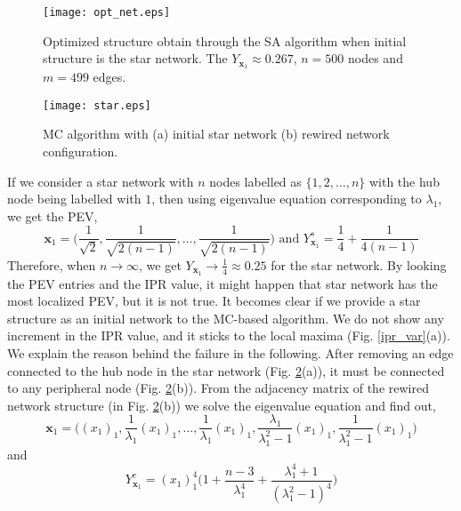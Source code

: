 \documentclass[envcountreset,oribibl]{llncs}
\begin{document}
\begin{figure}[t]
\begin{center}
\texttt{[image: opt\_net.eps]}
\caption{Optimized structure obtain through the SA algorithm when initial structure is the star network. The $Y_{\bm{x}_1} \approx 0.267$, $n=500$ nodes and $m=499$ edges.}
\label{opt_net_from_star}
\end{center}
\end{figure}
\begin{figure}[t]
\begin{center}
\texttt{[image: star.eps]}
\caption{MC algorithm with (a) initial star network (b) rewired network configuration.}
\label{star_falure}
\end{center}
\end{figure}
If we consider a star network with $n$ nodes labelled as $\{1,2,\ldots,n\}$ with the hub node being labelled with $1$, then using eigenvalue equation corresponding to $\lambda_{1}$, we get the PEV, 
\begin{equation}\nonumber
{\bm{x}_1}=\biggl(\frac{1}{\sqrt{2}},\frac{1}{\sqrt{2(n-1)}},\ldots, \frac{1}{\sqrt{2(n-1)}}\biggr)    
\text{ and }
Y_{\bm{x}_1}^{s} = \frac{1}{4} + \frac{1}{4(n-1)}    
\end{equation}
Therefore, when $n \rightarrow \infty$, we get $Y_{\bm{x}_1} \rightarrow \frac{1}{4} \approx 0.25$ for the star network. By looking the PEV entries and the IPR value, it might happen that star network has the most localized PEV, but it is not true.
It becomes clear if we provide a star structure as an initial network to the MC-based algorithm. We do not show any increment in the IPR value, and it sticks to the local maxima (Fig. \ref{ipr_var}(a)). We explain the reason behind the failure in the following. 
After removing an edge connected to the hub node in the star network (Fig. \ref{star_falure}(a)), it must be connected to any peripheral node (Fig. \ref{star_falure}(b)). From the adjacency matrix of the rewired network structure (in Fig. \ref{star_falure}(b)) we solve the eigenvalue equation and find out, 
\begin{equation}\nonumber
{\bm{x}_1}=\biggl((x_1)_1,\frac{1}{\lambda_1}(x_1)_1,\ldots,\frac{1}{\lambda_1}(x_1)_1, \frac{\lambda_1}{\lambda_1^2-1}(x_1)_1,\frac{1}{\lambda_1^2-1}(x_1)_1\biggr)    
\end{equation}
and
\begin{equation}\nonumber
Y_{\bm{x}_1}^{c} = (x_1)_1^4 \biggl(1+\frac{n-3}{\lambda_1^4} + \frac{\lambda_1^4+1}{(\lambda_1^2-1)^4}\biggr)    
\end{equation}
\end{document}
